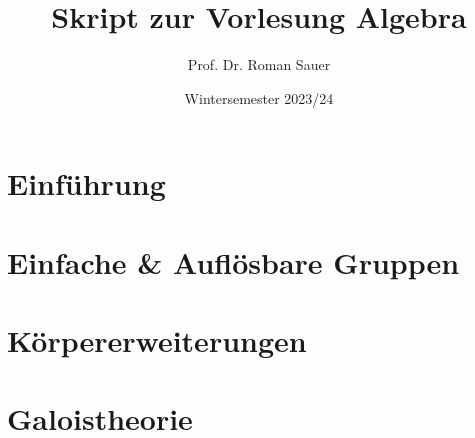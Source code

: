 \documentclass[11pt,a4paper]{article}
\title{Skript zur Vorlesung Algebra}
\author{Prof. Dr. Roman Sauer}
\date{Wintersemester 2023/24}
\theoremstyle{definition}
\theoremstyle{remark}
\begin{document}
\maketitle
\tableofcontents

\newpage

\section*{Einführung}



\newpage

\section{Einfache \& Auflösbare Gruppen}



\section{Körpererweiterungen}



\section{Galoistheorie}


\end{document}
